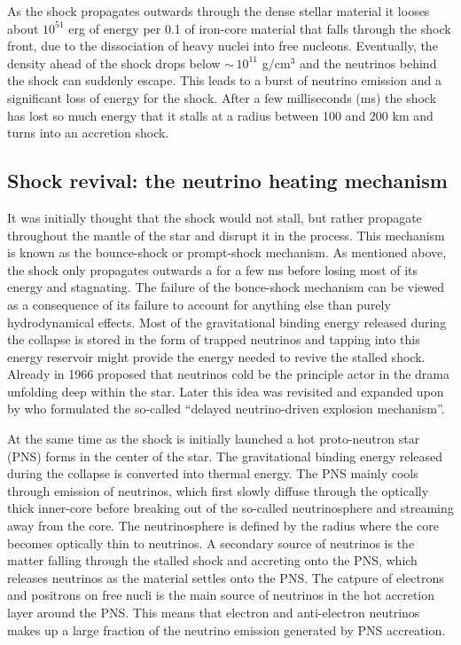 As the shock propagates outwards through the dense stellar material it looses about 
$10^{51}$ erg of energy per 0.1 \msun of iron-core material that falls through the shock front, 
due to the dissociation of heavy nuclei into free nucleons.
Eventually, the density ahead of the shock drops below $\sim \, 10^{11}$ g/cm$^3$ and
the neutrinos behind the shock can suddenly escape. This leads to a burst of neutrino emission and a significant loss of energy for the shock. After a few milliseconds (ms) the
shock has lost so much energy that it stalls at a radius between 100 and 200 km
and turns into an accretion shock.

\subsection{Shock revival: the neutrino heating mechanism}
It was initially thought that the shock would not stall, but rather propagate
throughout the mantle of the star and disrupt it in the process. 
This mechanism is known as the bounce-shock or prompt-shock mechanism.
As mentioned above, the shock only propagates outwards a for a few ms before losing most of its
energy and stagnating. The failure of the bonce-shock mechanism
can be viewed as a consequence of its failure to account for anything else than purely hydrodynamical effects. Most of the gravitational binding energy released during the collapse is stored in
the form of trapped neutrinos and tapping into this energy reservoir might provide the energy needed to revive the stalled shock.
Already in 1966 \cite{colgate_66} proposed that neutrinos cold be the principle
actor in the drama unfolding deep within the star. Later this idea was revisited and expanded upon by \cite{wilson_85}
who formulated the so-called ``delayed neutrino-driven explosion mechanism''.

At the same time as the shock is initially launched a hot proto-neutron star (PNS)
forms in the center of the star. The gravitational binding energy released during the collapse is 
converted into thermal energy. The PNS mainly cools
through emission of neutrinos, which first slowly diffuse through the optically thick inner-core
before breaking out of the so-called neutrinosphere and streaming away from the core.
The neutrinosphere is defined by the radius where the core becomes optically thin to neutrinos.
A secondary source of neutrinos is the matter falling through the stalled shock and accreting onto the PNS, 
which releases neutrinos as the material settles onto the PNS. The catpure of electrons and positrons 
on free nucli is the main source of neutrinos in the hot accretion layer
around the PNS. This means that electron and anti-electron neutrinos makes up 
a large fraction of the neutrino emission generated by PNS accreation. 

